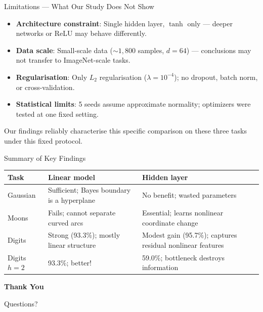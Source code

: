 \documentclass[11pt,aspectratio=169]{beamer}
\begin{document}
\begin{frame}{Limitations --- What Our Study Does Not Show}

\begin{itemize}
    \item \textbf{Architecture constraint}: Single hidden layer, $\tanh$ only --- deeper networks or ReLU may behave differently.
    \item \textbf{Data scale}: Small-scale data (${\sim}1{,}800$ samples, $d{=}64$) --- conclusions may not transfer to ImageNet-scale tasks.
    \item \textbf{Regularisation}: Only $L_2$ regularisation ($\lambda{=}10^{-4}$); no dropout, batch norm, or cross-validation.
    \item \textbf{Statistical limits}: 5 seeds assume approximate normality; optimizers were tested at one fixed setting.
\end{itemize}

\vspace{0.5em}
Our findings reliably characterise this specific comparison on these three tasks under this fixed protocol.

\end{frame}

\begin{frame}{Summary of Key Findings}

\begin{center}
\begin{tabular}{@{}lp{5.5cm}p{5.5cm}@{}}
\toprule
\textbf{Task} & \textbf{Linear model} & \textbf{Hidden layer} \\
\midrule
Gaussian & \textcolor{accentgreen}{Sufficient}; Bayes boundary is a hyperplane & No benefit; wasted parameters \\[4pt]
Moons & \textcolor{accentred}{Fails}; cannot separate curved arcs & \textcolor{accentgreen}{Essential}; learns nonlinear coordinate change \\[4pt]
Digits & \textcolor{accentgreen}{Strong} (93.3\%); mostly linear structure & \textcolor{accentgreen}{Modest gain} (95.7\%); captures residual nonlinear features \\[4pt]
Digits $h{=}2$ & \textcolor{accentgreen}{93.3\%};  better! & \textcolor{accentred}{59.0\%}; bottleneck destroys information \\
\bottomrule
\end{tabular}
\end{center}

\vspace{0.4em}

\end{frame}

\begin{frame}{}

\vfill
\centering
{\LARGE \textbf{Thank You}}

\vspace{1em}
{\large Questions?}

\vspace{2em}
\vfill

\end{frame}
\end{document}
